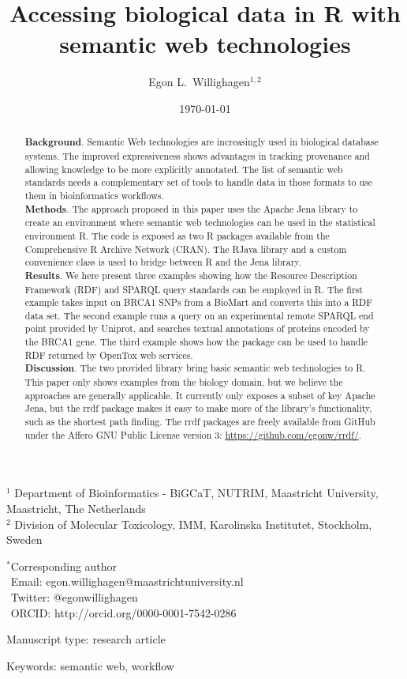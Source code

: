 \documentclass[12pt]{article}
\title{Accessing biological data in R with semantic web technologies}
\author{Egon L.\ Willighagen$^{1,2}$}
\begin{document}
\date{\today}
\maketitle

\noindent
$^1$ Department of Bioinformatics - BiGCaT, NUTRIM, Maastricht University, Maastricht, The Netherlands \\
$^2$ Division of Molecular Toxicology, IMM, Karolinska Institutet, Stockholm, Sweden

\bigskip
\noindent
$^*$Corresponding author\\
$\phantom{^*}$Email: egon.willighagen@maastrichtuniversity.nl\\
$\phantom{^*}$Twitter: @egonwillighagen\\
$\phantom{^*}$ORCID: http://orcid.org/0000-0001-7542-0286

\bigskip
\noindent
Manuscript type: research article

\bigskip
\noindent Keywords: semantic web, workflow

\newpage
\begin{abstract}
\noindent
\textbf{Background}. Semantic Web technologies are increasingly used in biological database systems.
The improved expressiveness shows advantages in tracking provenance and allowing knowledge to be
more explicitly annotated. The list of semantic web standards needs a complementary set of tools to
handle data in those formats to use them in bioinformatics workflows. \\
\textbf{Methods}. The approach proposed in this paper uses the Apache Jena library to create an
environment where semantic web technologies can be used in the statistical environment R. The
code is exposed as two R packages available from the Comprehensive R Archive Network (CRAN). 
The RJava library and a custom convenience class is used to bridge between R and the Jena library.\\
\textbf{Results}. We here present three examples showing how the Resource Description Framework
(RDF) and SPARQL query standards can be employed in R. The first example takes input on BRCA1 SNPs
from a BioMart and converts this into a RDF data set. The second example runs a query on an
experimental remote SPARQL end point provided by Uniprot, and searches textual annotations of
proteins encoded by the BRCA1 gene. The third example shows how the package can be used to handle
RDF returned by OpenTox web services. \\
\textbf{Discussion}. The two provided library bring basic semantic web technologies to R.
This paper only shows examples from the biology domain, but we believe the approaches are generally
applicable. It currently only exposes a subset of key Apache Jena, but the rrdf package
makes it easy to make more of the library's functionality, such as the shortest path finding.
The rrdf packages are freely available from GitHub under the 
Affero GNU Public License version 3: \url{https://github.com/egonw/rrdf/}.
\end{abstract}
\end{document}
